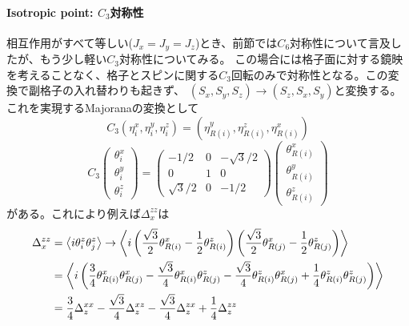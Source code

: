 \documentclass[11pt, aps, longbibliography]{article}
\begin{document}
        \paragraph{Isotropic point: $C_3$対称性}
        相互作用がすべて等しい($J_x=J_y=J_z$)とき、前節では$C_6$対称性について言及したが、もう少し軽い$C_3$対称性についてみる。
        この場合には格子面に対する鏡映を考えることなく、格子とスピンに関する$C_3$回転のみで対称性となる。この変換で副格子の入れ替わりも起きず、
        $(S_x,S_y,S_z) \rightarrow (S_z, S_x, S_y)$と変換する。これを実現するMajoranaの変換として
        \begin{equation}\label{eq:SO6Majorana-26}
            C_3(\eta_i^x, \eta_i^y, \eta_i^z) = (\eta_{R(i)}^y, \eta_{R(i)}^z, \eta_{R(i)}^x)
        \end{equation}
        \begin{equation}\label{eq:SO6Majorana-27}
            C_3 \begin{pmatrix}
                \theta_i^x \\ \theta_i^y \\ \theta_i^z
            \end{pmatrix} = \begin{pmatrix}
                -1/2 & 0 & -\sqrt{3}/2 \\ 0 & 1 & 0 \\ \sqrt{3}/2 & 0 & -1/2
            \end{pmatrix} \begin{pmatrix}
                \theta_{R(i)}^x \\ \theta_{R(i)}^y \\ \theta_{R(i)}^z
            \end{pmatrix}
        \end{equation}
        がある。これにより例えば$\Delta_x^{zz}$は
        \begin{align}\label{eq:SO6Majorana-28}
            \Delta_x^{zz} &= \expval{i\theta_i^z\theta_j^z} \rightarrow \expval{i \left(\frac{\sqrt{3}}{2}\theta_{R(i)}^x -\frac{1}{2}\theta_{R(i)}^z \right)\left(\frac{\sqrt{3}}{2}\theta_{R(j)}^x -\frac{1}{2}\theta_{R(j)}^z \right)} \notag \\
            &= \expval{i \left( \frac{3}{4}\theta_{R(i)}^x\theta_{R(j)}^x -\frac{\sqrt{3}}{4}\theta_{R(i)}^x\theta_{R(j)}^z -\frac{\sqrt{3}}{4}\theta_{R(i)}^z\theta_{R(j)}^x + \frac{1}{4}\theta_{R(i)}^z\theta_{R(j)}^z \right)} \notag \\
            &= \frac{3}{4}\Delta_{z}^{xx} -\frac{\sqrt{3}}{4}\Delta_{z}^{xz} -\frac{\sqrt{3}}{4}\Delta_{z}^{zx} + \frac{1}{4}\Delta_{z}^{zz}
        \end{align}
\end{document}
